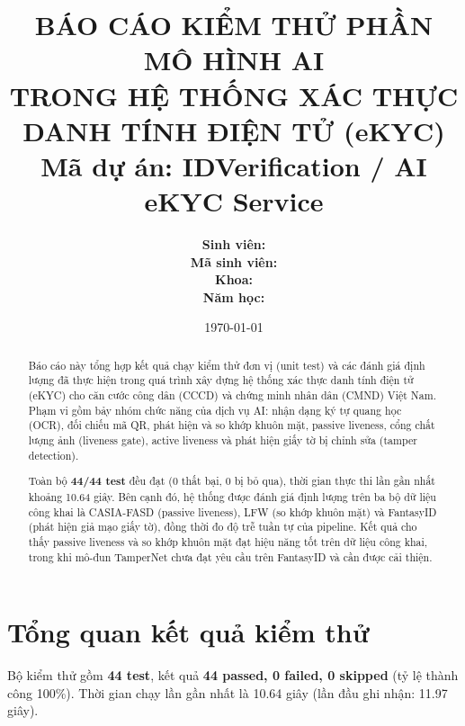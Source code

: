 \documentclass[12pt,a4paper]{article}
\title{\textbf{BÁO CÁO KIỂM THỬ PHẦN MÔ HÌNH AI\\[1mm]
TRONG HỆ THỐNG XÁC THỰC DANH TÍNH ĐIỆN TỬ (eKYC)}\\[4mm]
\large Mã dự án: IDVerification / AI eKYC Service}
\author{
  \textbf{Sinh viên:} \underline{\hspace{5cm}}\\[2mm]
  \textbf{Mã sinh viên:} \underline{\hspace{4cm}}\\[2mm]
  \textbf{Khoa:} \underline{\hspace{5cm}}\\[2mm]
  \textbf{Năm học:} \underline{\hspace{4cm}}
}
\date{\today}
\begin{document}
\maketitle

\begin{abstract}
Báo cáo này tổng hợp kết quả chạy kiểm thử đơn vị (unit test) và các đánh giá định lượng đã thực hiện
trong quá trình xây dựng hệ thống xác thực danh tính điện tử (eKYC) cho căn cước công dân (CCCD) và
chứng minh nhân dân (CMND) Việt Nam. Phạm vi gồm bảy nhóm chức năng của dịch vụ AI: nhận dạng ký tự
quang học (OCR), đối chiếu mã QR, phát hiện và so khớp khuôn mặt, passive liveness, cổng chất lượng ảnh
(liveness gate), active liveness và phát hiện giấy tờ bị chỉnh sửa (tamper detection).

Toàn bộ \textbf{44/44 test} đều đạt (0 thất bại, 0 bị bỏ qua), thời gian thực thi lần gần nhất khoảng
\num{10.64} giây. Bên cạnh đó, hệ thống được đánh giá định lượng trên ba bộ dữ liệu công khai là
CASIA-FASD (passive liveness), LFW (so khớp khuôn mặt) và FantasyID (phát hiện giả mạo giấy tờ), đồng thời
đo độ trễ tuần tự của pipeline. Kết quả cho thấy passive liveness và so khớp khuôn mặt đạt hiệu năng tốt
trên dữ liệu công khai, trong khi mô-đun TamperNet chưa đạt yêu cầu trên FantasyID và cần được cải thiện.
\end{abstract}

\section{Tổng quan kết quả kiểm thử}
Bộ kiểm thử gồm \textbf{44 test}, kết quả \textbf{44 passed, 0 failed, 0 skipped} (tỷ lệ thành công 100\%).
Thời gian chạy lần gần nhất là \num{10.64} giây (lần đầu ghi nhận: \num{11.97} giây).
\end{document}
